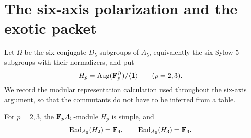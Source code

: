 \section{The six-axis polarization and the exotic packet}
\label{sec:envelope}

Let \(\Omega\) be the six conjugate \(D_5\)-subgroups of \(A_5\), equivalently
the six Sylow-\(5\) subgroups with their normalizers, and put
\[
 H_p=\operatorname{Aug}(\mathbf F_p^\Omega)/\langle\mathbf1\rangle
 \qquad(p=2,3).
\]
We record the modular representation calculation used throughout the
six-axis argument, so that the commutants do not have to be inferred from a
table.

\begin{lemma}\label{lem:six-point-hearts}
%
%
For $p=2,3$, the $\mathbf F_pA_5$-module $H_p$ is simple, and
\[
  \operatorname{End}_{A_5}(H_2)=\mathbf F_4,
  \qquad
  \operatorname{End}_{A_5}(H_3)=\mathbf F_3.
\]
\end{lemma}


